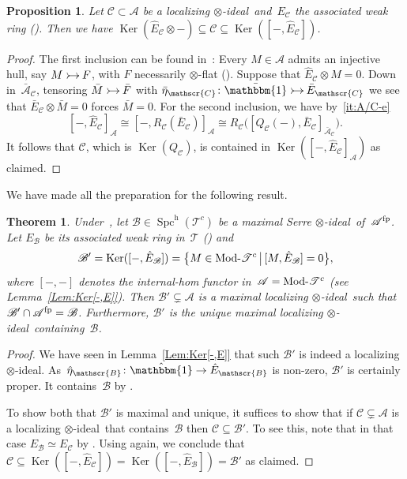 \documentclass[JEP,XML,SOM,Unicode]{cedram}
\makeatletter
\newcommand{\into}{\mathchoice{\xymatrix@=.5cm{\ar@{>->}[r]&}}
{\xymatrix@=.3cm{\ar@{>->}[r]&}\hspace*{-1mm}}
{\hspace*{-1mm}\xymatrix@=.25cm{\ar@{>->}[r]&}\hspace*{-1.5mm}}
{\xymatrix@=.1cm{\ar@{>->}[r]&}\hspace*{-1mm}}
}
\numberwithin{equation}{section}
\newtheorem{Thm}[equation]{Theorem}
\newtheorem{Prop}[equation]{Proposition}
\theoremstyle{definition}
\DeclareMathOperator{\Ker}{Ker}
\DeclareMathOperator{\Spc}{Spc}
\newcommand{\cat}[1]{\mathscr{#1}}
\newcommand{\SET}[2]{\big\{#1\,\big|\,#2\big\}}
\newcommand{\unit}{\mathbbm{1}}
\DeclareMathOperator{\Mod}{Mod}
\newcommand{\smallh}{\mathrm{h}}
\newcommand{\AC}{\bar{\cA}_{\cC}}
\newcommand{\bEC}{\bar E_{\cC}}
\newcommand{\bunit}{\bar\unit}
\newcommand{\cA}{\cat{A}}
\newcommand{\cB}{\cat{B}}
\newcommand{\cC}{\cat{C}}
\newcommand{\cT}{\cat{T}}
\newcommand{\EB}{E_{\cB}}
\newcommand{\EC}{E_{\cC}}
\newcommand{\fp}{^{\textup{fp}}}
\newcommand{\hEB}{\hat E_{\cB}}
\newcommand{\hEC}{\hat E_{\cC}}
\newcommand{\hunit}{\hat\unit}
\newcommand{\Modd}{\Mod\text{\!-}}
\newcommand{\MT}{\Modd\cat T^c}
\newcommand{\SpchT}{\Spch(\cat{T}^c)}
\newcommand{\Spch}{\Spc^{\smallh}}
\newcommand{\tensid}{$\otimes$\nobreakdash-ideal}
\makeatother
\begin{document}
\begin{Prop}
\label{Prop:Ker@<C<Ker[]}
Let $\cC\subset\cA$ be a localizing \tensid\ and~$\EC$ the associated weak ring (). Then we have $\Ker(\hEC\otimes-)\subseteq\cC\subseteq\Ker([-,\hEC])$.
\end{Prop}

\begin{proof}
The first inclusion can be found in~\cite{BalmerKrauseStevenson19}: Every $M\in\cA$ admits an injective hull, say $M\into F$, with $F$ necessarily $\otimes$-flat (). Suppose that $\hEC\otimes M=0$. Down in~$\AC$, tensoring $\bar M\into \bar F$ with $\bar\eta_\cC\colon \bunit\into \bEC$ we see that $\bEC\otimes \bar M=0$ forces $\bar M=0$. For the second inclusion, we have by \,\eqref{it:A/C-e}
\[
[-,\hEC]_{\cA}\cong[-,R_{\cC}(\bEC)]_{\cA}\cong R_{\cC}\big([Q_{\cC}(-),\bEC]_{\AC}\big).
\]
It follows that $\cC$, which is $\Ker(Q_{\cC})$, is contained in $\Ker([-,\hEC]_{\cA})$ as claimed.
\end{proof}

We have made all the preparation for the following result.
\begin{Thm}
\label{Thm:max-to-max}
Under~, let $\cB\in\SpchT$ be a maximal Serre \tensid\ of~$\cA\fp$. Let $\EB$ be its associated weak ring in~$\cT$ () and
\begin{equation}
\label{eq:max-vs-max}
{\cB'}=\Ker([-,\hEB])=\SET{M\in\MT}{[M,\hEB]=0},
\end{equation}
where $[-,-]$ denotes the internal-hom functor in~$\cA=\MT$ (see Lemma~\ref{Lem:Ker[-,E]}). Then $\cB'\subsetneq\cA$ is a maximal localizing \tensid\ such that $\cB'\cap \cA\fp=\cB$. Furthermore, $\cB'$ is the \emph{unique} maximal localizing \tensid\ containing~$\cB$.
\end{Thm}

\begin{proof}
We have seen in Lemma~\ref{Lem:Ker[-,E]} that such $\cB'$ is indeed a localizing \tensid. As~$\hat\eta_\cB\colon \hunit\to \hEB$ is non-zero, $\cB'$ is certainly proper. It contains~$\cB$ by .

To show both that $\cB'$ is maximal and unique, it suffices to show that if $\cC\subsetneq\cA$ is a localizing \tensid\ that contains~$\cB$ then $\cC\subseteq\cB'$. To see this, note that in that case $\EB\simeq\EC$ by . Using  again, we conclude that $\cC\subseteq\Ker([-,\hEC])=\Ker([-,\hEB])=\cB'$ as claimed.
\end{proof}
\end{document}
